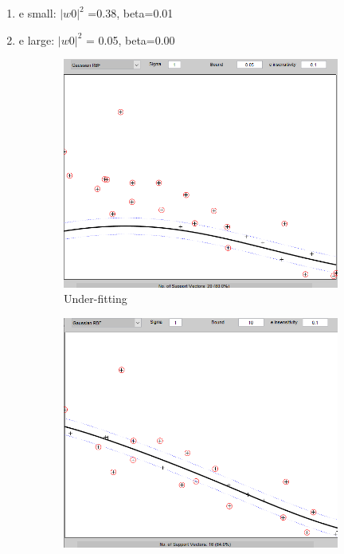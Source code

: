 \documentclass{article}
\begin{document}
        \begin{enumerate}
            \item e small: $|w0|^2$ =0.38, beta=0.01
            \item e large: $|w0|^2$ = 0.05, beta=0.00
        \end{enumerate}
    
    
        \begin{figure}[h]
             \centering
             \begin{subfigure}[b]{0.3\textwidth}
                 \centering
                 \includegraphics[width=\textwidth]{Assignment 2/figures/1_1/rbf_bound_small.png}
                 \caption{Under-fitting}
                 \label{fig:rbf_small_bound}
             \end{subfigure}
             \hfill
             \begin{subfigure}[b]{0.3\textwidth}
                 \centering
                 \includegraphics[width=\textwidth]{Assignment 2/figures/1_1/rbf_bound_medium.png}

\end{subfigure}
\end{figure}
\end{document}
